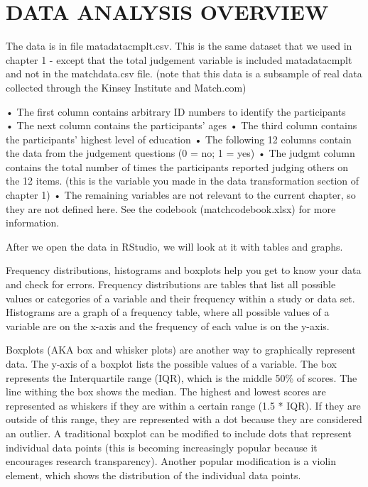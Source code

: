 \documentclass[
]{book}
\begin{document}
\hypertarget{data-analysis-overview}{%
\section{DATA ANALYSIS OVERVIEW}\label{data-analysis-overview}}

The data is in file matadatacmplt.csv. This is the same dataset that we used in chapter 1 - except that the total judgement variable is included matadatacmplt and not in the matchdata.csv file. (note that this data is a subsample of real data collected through the Kinsey Institute and Match.com)

• The first column contains arbitrary ID numbers to identify the participants\\
• The next column contains the participants' ages
• The third column contains the participants' highest level of education
• The following 12 columns contain the data from the judgement questions (0 = no; 1 = yes)
• The judgmt column contains the total number of times the participants reported judging others on the 12 items. (this is the variable you made in the data transformation section of chapter 1)
• The remaining variables are not relevant to the current chapter, so they are not defined here. See the codebook (matchcodebook.xlsx) for more information.

After we open the data in RStudio, we will look at it with tables and graphs.

Frequency distributions, histograms and boxplots help you get to know your data and check for errors. Frequency distributions are tables that list all possible values or categories of a variable and their frequency within a study or data set. Histograms are a graph of a frequency table, where all possible values of a variable are on the x-axis and the frequency of each value is on the y-axis.

Boxplots (AKA box and whisker plots) are another way to graphically represent data. The y-axis of a boxplot lists the possible values of a variable. The box represents the Interquartile range (IQR), which is the middle 50\% of scores. The line withing the box shows the median. The highest and lowest scores are represented as whiskers if they are within a certain range (1.5 * IQR). If they are outside of this range, they are represented with a dot because they are considered an outlier. A traditional boxplot can be modified to include dots that represent individual data points (this is becoming increasingly popular because it encourages research transparency). Another popular modification is a violin element, which shows the distribution of the individual data points.
\end{document}
